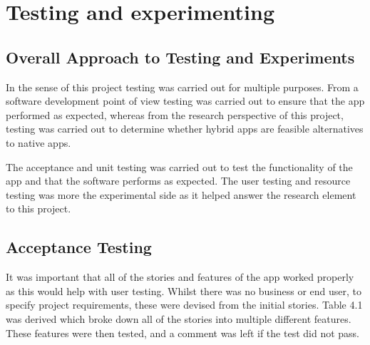 \chapter{Testing and experimenting}


\section{Overall Approach to Testing and Experiments}
In the sense of this project testing was carried out for multiple purposes. From a software development point of view testing was carried out to ensure that the app performed as expected, whereas from the research perspective of this project, testing was carried out to determine whether hybrid apps are feasible alternatives to native apps.

The acceptance and unit testing was carried out to test the functionality of the app and that the software performs as expected. The user testing and resource testing was more the experimental side as it helped answer the research element to this project.

\section{Acceptance Testing}
It was important that all of the stories and features of the app worked properly as this would help with user testing. Whilst there was no business or end user, to specify project requirements, these were devised from the initial stories. Table 4.1 was derived which broke down all of the stories into multiple different features. These features were then tested, and a comment was left if the test did not pass.

